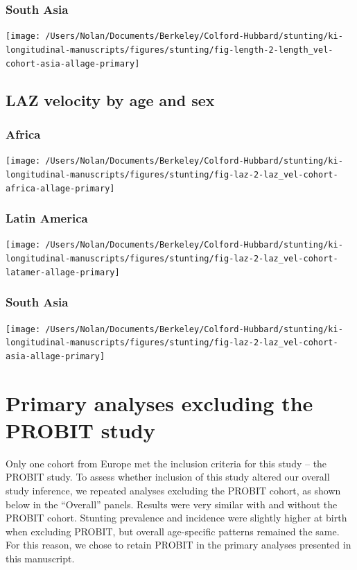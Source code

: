 \documentclass[9pt,]{book}
\begin{document}
\subsection{South Asia}\label{south-asia-3}

\texttt{[image: /Users/Nolan/Documents/Berkeley/Colford-Hubbard/stunting/ki-longitudinal-manuscripts/figures/stunting/fig-length-2-length\_vel-cohort-asia-allage-primary]}

\section{LAZ velocity by age and sex}\label{laz-velocity-by-age-and-sex}

\subsection{Africa}\label{africa-4}

\texttt{[image: /Users/Nolan/Documents/Berkeley/Colford-Hubbard/stunting/ki-longitudinal-manuscripts/figures/stunting/fig-laz-2-laz\_vel-cohort-africa-allage-primary]}

\subsection{Latin America}\label{latin-america-4}

\texttt{[image: /Users/Nolan/Documents/Berkeley/Colford-Hubbard/stunting/ki-longitudinal-manuscripts/figures/stunting/fig-laz-2-laz\_vel-cohort-latamer-allage-primary]}

\subsection{South Asia}\label{south-asia-4}

\texttt{[image: /Users/Nolan/Documents/Berkeley/Colford-Hubbard/stunting/ki-longitudinal-manuscripts/figures/stunting/fig-laz-2-laz\_vel-cohort-asia-allage-primary]}

\chapter{Primary analyses excluding the PROBIT
study}\label{exclude-PROBIT}

\raggedright

Only one cohort from Europe met the inclusion criteria for this study --
the PROBIT study. To assess whether inclusion of this study altered our
overall study inference, we repeated analyses excluding the PROBIT
cohort, as shown below in the ``Overall'' panels. Results were very
similar with and without the PROBIT cohort. Stunting prevalence and
incidence were slightly higher at birth when excluding PROBIT, but
overall age-specific patterns remained the same. For this reason, we
chose to retain PROBIT in the primary analyses presented in this
manuscript.
\end{document}
